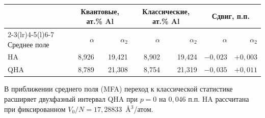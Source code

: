 \begin{center}
\small
\begin{tabular}{@{}lrrrrrr@{}}
\toprule
 & \multicolumn{2}{c}{Квантовые, ат.\% Al}
 & \multicolumn{2}{c}{Классические, ат.\% Al}
 & \multicolumn{2}{c}{Сдвиг, п.п.}\\
\cmidrule(lr){2-3}\cmidrule(lr){4-5}\cmidrule(l){6-7}
Среднее поле & \(\alpha\) & \(\alpha_2\) & \(\alpha\) & \(\alpha_2\)
 & \(\alpha\) & \(\alpha_2\)\\
\midrule
HA  & 8,926 & 19,421 & 8,902 & 19,424 & \(-0{,}023\) & \(+0{,}003\)\\
QHA & 8,789 & 21,308 & 8,754 & 21,319 & \(-0{,}035\) & \(+0{,}011\)\\
\bottomrule
\end{tabular}
\end{center}
В приближении среднего поля (MFA) переход к классической статистике
расширяет двухфазный интервал QHA при \(p=0\) на \(0{,}046\) п.п.
HA рассчитана при фиксированном \(V_0/N=17{,}28833\)~\AA$^3$/атом.
